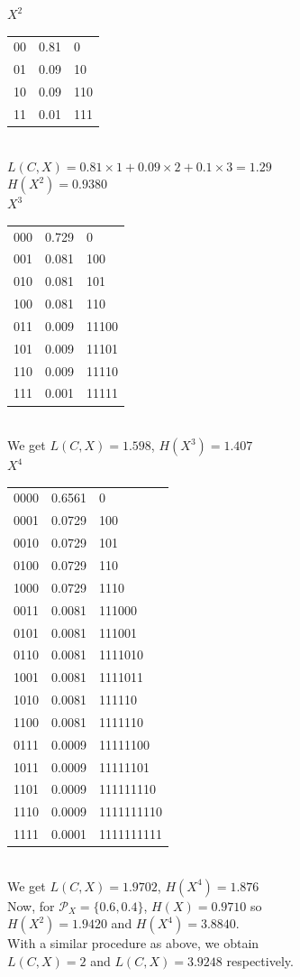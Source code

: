 \documentclass[12pt, a4paper]{article}
\begin{document}
\begin{sol}
$X^2$ \\
\begin{tabular}{ c c l }
00 & 0.81 & 0 \\ 
01 & 0.09 & 10 \\  
10 & 0.09 & 110 \\
11 & 0.01 & 111 
\end{tabular}\\

$L(C, X) = 0.81 \times 1 + 0.09 \times 2 + 0.1 \times 3 = 1.29$ \\
$H(X^2) = 0.9380$ \\


$X^3$ \\
\begin{tabular}{ c c l }
000 & 0.729 & 0 \\ 
001 & 0.081 & 100 \\  
010 & 0.081 & 101 \\
100 & 0.081 & 110 \\
011 & 0.009 & 11100 \\ 
101 & 0.009 & 11101 \\  
110 & 0.009 & 11110 \\
111 & 0.001 & 11111 
\end{tabular}\\

We get $L(C, X) = 1.598$, $H(X^3) = 1.407$ \\


$X^4$ \\
\begin{tabular}{ c c l }
0000 & 0.6561 & 0 \\ 
0001 & 0.0729 & 100 \\  
0010 & 0.0729 & 101 \\
0100 & 0.0729 & 110 \\
1000 & 0.0729 & 1110 \\ 
0011 & 0.0081 & 111000 \\  
0101 & 0.0081 & 111001 \\
0110 & 0.0081 & 1111010 \\
1001 & 0.0081 & 1111011 \\ 
1010 & 0.0081 & 111110 \\  
1100 & 0.0081 & 1111110 \\
0111 & 0.0009 & 11111100 \\
1011 & 0.0009 & 11111101 \\ 
1101 & 0.0009 & 111111110 \\  
1110 & 0.0009 & 1111111110 \\
1111 & 0.0001 & 1111111111 
\end{tabular}\\

We get $L(C, X) = 1.9702$, $H(X^4) = 1.876$ \\


Now, for $\mathcal{P}_X = \{0.6, 0.4\}$, $H(X) = 0.9710$ so \\
$H(X^2) = 1.9420$ and $H(X^4) = 3.8840$. \\
With a similar procedure as above, we obtain \\
$L(C, X) = 2$ and $L(C, X) = 3.9248$ respectively.

\end{sol}
\end{document}
